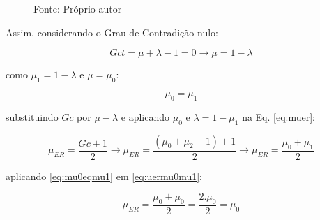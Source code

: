 \begin{figure}[!htb]
{}

\label{fig:sistPrimeiraOrdem}

{\small Fonte: Próprio autor}
\end{figure}








\vspace{3cm}

Assim, considerando o Grau de Contradição nulo:

\begin{equation}
Gct = \mu + \lambda - 1 = 0 \rightarrow \mu = 1 - \lambda
\end{equation}

como $\mu_1 = 1 - \lambda$ e $\mu = \mu_0$:

\begin{equation}
\mu_0 = \mu_1
\label{eq:mu0eqmu1}
\end{equation}

substituindo $Gc$ por $\mu-\lambda$ e aplicando $\mu_0$ e $\lambda = 1 - \mu_1$ na Eq. \ref{eq:muer}:

\begin{equation}
\mu_{ER} = \frac{Gc + 1}{2} \rightarrow \mu_{ER} = \frac{(\mu_0 + \mu_2 - 1) + 1}{2} \rightarrow \mu_{ER} = \frac{\mu_0 + \mu_1}{2}
\label{eq:uermu0mu1}
\end{equation}

aplicando \ref{eq:mu0eqmu1} em \ref{eq:uermu0mu1}:

\begin{equation}
\mu_{ER} = \frac{\mu_0 + \mu_0}{2} = \frac{2.\mu_0}{2} = \mu_0
\end{equation}


